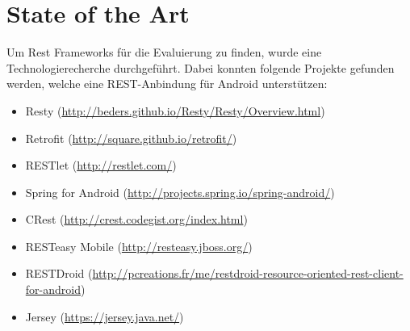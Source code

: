 \chapter{State of the Art}
\label{sec:stateOfTheArt}

Um Rest Frameworks für die Evaluierung zu finden, wurde eine Technologierecherche durchgeführt. Dabei konnten folgende Projekte gefunden werden, welche eine REST-Anbindung für Android unterstützen:
\begin{itemize}
	\item Resty (\href{http://beders.github.io/Resty/Resty/Overview.html}{http://beders.github.io/Resty/Resty/Overview.html})
	\item Retrofit (\href{http://square.github.io/retrofit/}{http://square.github.io/retrofit/})
	\item RESTlet (\href{http://restlet.com/}{http://restlet.com/})
	\item Spring for Android (\href{http://projects.spring.io/spring-android/}{http://projects.spring.io/spring-android/})
	\item CRest (\href{http://crest.codegist.org/index.html}{http://crest.codegist.org/index.html})
	\item RESTeasy Mobile (\href{http://resteasy.jboss.org/}{http://resteasy.jboss.org/})
	\item RESTDroid (\href{http://pcreations.fr/me/restdroid-resource-oriented-rest-client-for-android}{http://pcreations.fr/me/restdroid-resource-oriented-rest-client-for-android})
	\item Jersey (\href{https://jersey.java.net/}{https://jersey.java.net/})
\end{itemize}

